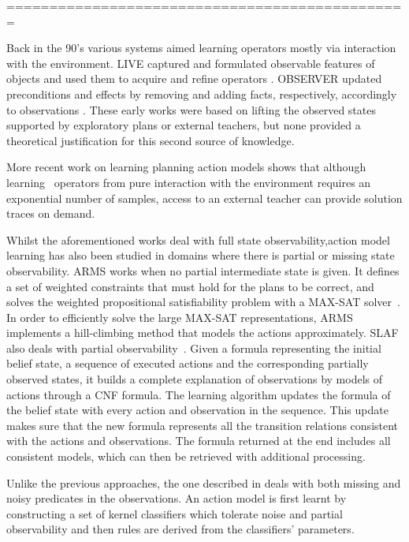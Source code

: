 ===============================================

Back in the 90's various systems aimed learning operators mostly via interaction with the environment. {\sc LIVE} captured and formulated observable features of objects and used them to acquire and refine operators \cite{ShenS89}. {\sc OBSERVER} updated preconditions and effects by removing and adding facts, respectively, accordingly to observations \cite{Wang95learningby}. These early works were based on lifting the observed states supported by exploratory plans or external teachers, but none provided a theoretical justification for this second source of knowledge.

More recent work on learning planning action models \cite{WalshL08} shows that although learning \strips\ operators from pure interaction with the environment requires an exponential number of samples, access to an external teacher can provide solution traces on demand.

Whilst the aforementioned works deal with full state observability,action model learning has also been studied in domains where there is partial or missing state observability. {\sf ARMS} works when no partial intermediate state is given. It defines a set of weighted constraints that must hold for the plans to be correct, and solves the weighted propositional satisfiability problem with a MAX-SAT solver~\cite{yang2007learning}. In order to efficiently solve the large MAX-SAT representations, {\sf ARMS} implements a hill-climbing method that models the actions approximately. %
{\sc SLAF} also deals with partial observability~\cite{amir:alearning:JAIR08}. Given a formula representing the initial belief state, a sequence of executed actions and the corresponding partially observed states, it builds a complete explanation of observations by models of actions through a CNF formula. The learning algorithm updates the formula of the belief state with every action and observation in the sequence. This update makes sure that the new formula represents all the transition relations consistent with the actions and observations. The formula returned at the end includes all consistent models, which can then be retrieved with additional processing.

Unlike the previous approaches, the one described in \cite{MouraoZPS12} deals with both missing and noisy predicates in the observations. An action model is first learnt by constructing a set of kernel classifiers which tolerate noise and partial observability and then \strips rules are derived from the classifiers' parameters.

